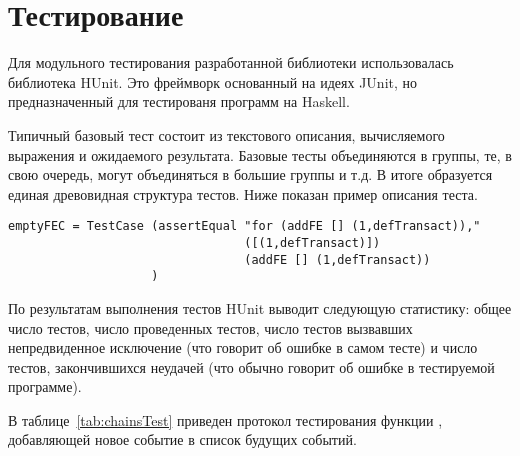     





\section{Тестирование}

Для модульного тестирования разработанной библиотеки использовалась библиотека HUnit\cite{HUnit}. Это фреймворк основанный на идеях JUnit, но предназначенный для тестированя программ на Haskell.

Типичный базовый тест состоит из текстового описания, вычисляемого выражения и ожидаемого результата. Базовые тесты объединяются в группы, те, в свою очередь, могут объединяться в большие группы и т.д. В итоге образуется единая древовидная структура тестов. Ниже показан пример описания теста.

\begin{verbatim}
emptyFEC = TestCase (assertEqual "for (addFE [] (1,defTransact))," 
                                 ([(1,defTransact)]) 
                                 (addFE [] (1,defTransact))
                    )
\end{verbatim}

По результатам выполнения тестов HUnit выводит следующую статистику: общее число тестов, число проведенных тестов, число тестов вызвавших непредвиденное исключение (что говорит об ошибке в самом тесте) и число тестов, закончившихся неудачей (что обычно говорит об ошибке в тестируемой программе).

В таблице~\ref{tab:chainsTest} приведен протокол тестирования функции , добавляющей новое событие в список будущих событий.


